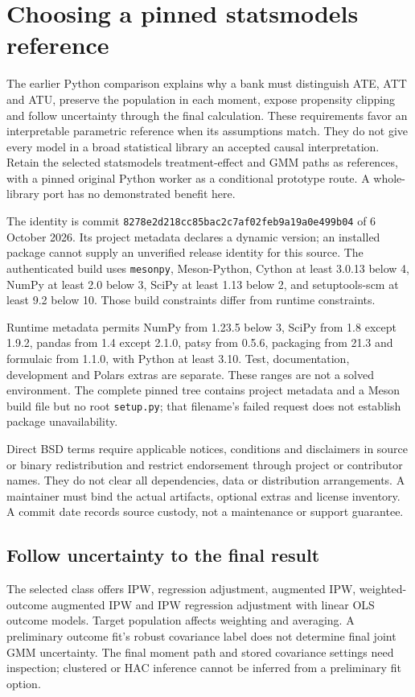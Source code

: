 \section{Choosing a pinned statsmodels reference}
\label{sec:exec24-statsmodels-reuse}
The earlier Python comparison explains why a bank must distinguish ATE, ATT and ATU, preserve the population in each moment, expose propensity clipping and follow uncertainty through the final calculation. These requirements favor an interpretable parametric reference when its assumptions match. They do not give every model in a broad statistical library an accepted causal interpretation. Retain the selected statsmodels treatment-effect and GMM paths as references, with a pinned original Python worker as a conditional prototype route. A whole-library port has no demonstrated benefit here.\citep{exec20_python_effect_source,exec20_python_effect_reference}

The identity is commit \texttt{8278e2d218cc85bac2c7af02feb9a19a0e499b04} of 6 October 2026. Its project metadata declares a dynamic version; an installed package cannot supply an unverified release identity for this source. The authenticated build uses \texttt{mesonpy}, Meson-Python, Cython at least 3.0.13 below 4, NumPy at least 2.0 below 3, SciPy at least 1.13 below 2, and setuptools-scm at least 9.2 below 10. Those build constraints differ from runtime constraints.\citep{exec24_statsmodels_distribution}

Runtime metadata permits NumPy from 1.23.5 below 3, SciPy from 1.8 except 1.9.2, pandas from 1.4 except 2.1.0, patsy from 0.5.6, packaging from 21.3 and formulaic from 1.1.0, with Python at least 3.10. Test, documentation, development and Polars extras are separate. These ranges are not a solved environment. The complete pinned tree contains project metadata and a Meson build file but no root \texttt{setup.py}; that filename's failed request does not establish package unavailability.\citep{exec24_statsmodels_distribution}

Direct BSD terms require applicable notices, conditions and disclaimers in source or binary redistribution and restrict endorsement through project or contributor names. They do not clear all dependencies, data or distribution arrangements. A maintainer must bind the actual artifacts, optional extras and license inventory. A commit date records source custody, not a maintenance or support guarantee.\citep{exec20_python_effect_source,exec24_statsmodels_distribution}

\subsection{Follow uncertainty to the final result}
The selected class offers IPW, regression adjustment, augmented IPW, weighted-outcome augmented IPW and IPW regression adjustment with linear OLS outcome models. Target population affects weighting and averaging. A preliminary outcome fit's robust covariance label does not determine final joint GMM uncertainty. The final moment path and stored covariance settings need inspection; clustered or HAC inference cannot be inferred from a preliminary fit option.\citep{exec20_python_effect_source}


